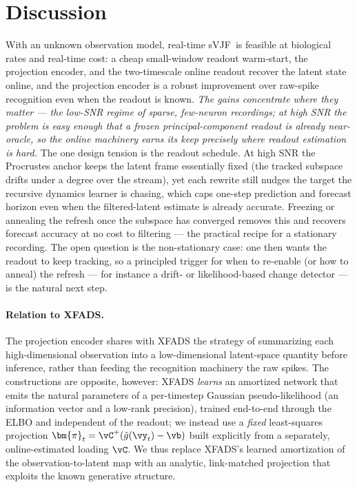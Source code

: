 \documentclass[11pt]{article}
\newcommand{\vpi}{\bm{\pi}}
\newcommand{\svjf}{sVJF}
\begin{document}
\section{Discussion}\label{sec:discussion}
With an unknown observation model, real-time \svjf\ is feasible at biological rates and real-time
cost: a cheap small-window readout warm-start, the projection encoder, and the two-timescale online
readout recover the latent state online, and the projection encoder is a robust improvement over
raw-spike recognition even when the readout is known. \emph{The gains concentrate where they
matter --- the low-SNR regime of sparse, few-neuron recordings; at high SNR the problem is easy
enough that a frozen principal-component readout is already near-oracle, so the online machinery
earns its keep precisely where readout estimation is hard.} The one design tension is the readout
schedule. At high SNR the Procrustes anchor keeps the latent frame essentially fixed (the tracked
subspace drifts under a degree over the stream), yet each rewrite still nudges the target the
recursive dynamics learner is chasing, which caps one-step prediction and forecast horizon even
when the filtered-latent estimate is already accurate. Freezing or annealing the refresh once the subspace
has converged removes this and recovers forecast accuracy at no cost to filtering --- the practical
recipe for a stationary recording. The open question is the non-stationary case: one then wants the
readout to keep tracking, so a principled trigger for when to re-enable (or how to anneal) the
refresh --- for instance a drift- or likelihood-based change detector --- is the natural next step.

\paragraph{Relation to XFADS.} The projection encoder shares with XFADS
\autocite{Dowling2024b} the strategy of summarizing each high-dimensional observation into a
low-dimensional latent-space quantity before inference, rather than feeding the recognition
machinery the raw spikes. The constructions are opposite, however: XFADS \emph{learns} an
amortized network that emits the natural parameters of a per-timestep Gaussian pseudo-likelihood
(an information vector and a low-rank precision), trained end-to-end through the ELBO and
independent of the readout; we instead use a \emph{fixed} least-squares projection
$\vpi_t=\vC^{+}(\tilde g(\vy_t)-\vb)$ built explicitly from a separately, online-estimated loading
$\vC$. We thus replace XFADS's learned amortization of the observation-to-latent map with an
analytic, link-matched projection that exploits the known generative structure.
\end{document}
